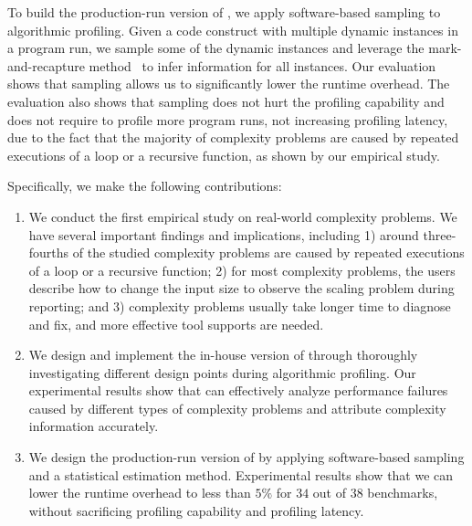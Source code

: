 To build the production-run version of \Tool,
we apply software-based sampling to algorithmic profiling.
Given a code construct with multiple dynamic instances in a program run,
we sample some of the dynamic instances and leverage the mark-and-recapture 
method~\citep{mark-recapture} to infer information for all instances. 
Our evaluation shows that 
sampling allows us to significantly lower the runtime overhead.
The evaluation also shows that sampling does not hurt the profiling capability 
and does not require to profile more program runs, 
not increasing profiling latency, due to the fact that
the majority of complexity problems are caused by 
repeated executions of a loop or a recursive function, as shown by our empirical study.



Specifically, we make the following contributions:

\begin{enumerate}

\item We conduct the first empirical study on real-world complexity problems. 
We have several important findings and implications, including
1) around three-fourths of the studied complexity problems are 
caused by repeated executions of a loop or a recursive function;
2) for most complexity problems, 
the users describe how to change the input size to observe the scaling problem during reporting;
and 3) complexity problems usually take longer time to diagnose and fix, 
and more effective tool supports are needed.  

\item We design and implement the in-house version of \Tool through 
thoroughly investigating different design points during algorithmic profiling. 
Our experimental results show that \Tool can effectively analyze performance failures 
caused by different types of complexity problems and attribute complexity information accurately.  

\item We design the production-run version of \Tool by applying 
software-based sampling and a statistical estimation method. 
Experimental results show that we can lower the runtime overhead to less than 
$5\%$ for $34$ out of $38$ benchmarks, 
without sacrificing profiling capability and profiling latency.  

\end{enumerate}

